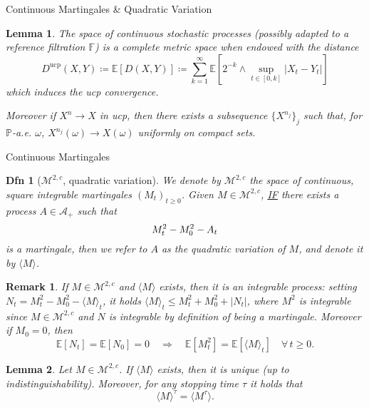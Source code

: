 \documentclass[a4paper]{article}
\theoremstyle{mytheoremstyle}
\newtheorem{definition}{Dfn}
\newtheorem{lemma}{Lemma}
\newtheorem*{remark}{Remark}
\newcommand{\1}{\mathds{1}}
\begin{document}
\begin{multicols*}{3}
\begin{roundbox}{Continuous Martingales \& Quadratic Variation}
\begin{lemma}
  \label{lem:ucp.metric}The space of continuous stochastic processes (possibly
  adapted to a reference filtration $\mathbb{F}$) is a complete metric space
  when endowed with the distance
  \[ D^{\operatorname{ucp}} (X, Y) \coloneq \mathbb{E} [D (X, Y)] \coloneq \sum_{k =
     1}^{\infty} \mathbb{E} \left[2^{- k} \wedge \sup_{t \in [0, k]} | X_t - Y_t | \right]
  \]
  which induces the ucp convergence.
  
  Moreover if $X^n \rightarrow X$ in ucp, then there exists a subsequence $\{
  X^{n_j} \}_j$ such that, for $\mathbb{P}$-a.e. $\omega$, $X^{n_j} (\omega)
  \rightarrow X (\omega)$ uniformly on compact sets.
\end{lemma}
\end{roundbox}


\begin{roundbox}{Continuous Martingales}
\begin{definition}[$\mathcal{M}^{2, c}$, quadratic variation]
  \label{defn:quadratic.variation}We denote by $\mathcal{M}^{2, c}$ the space
  of continuous, square integrable martingales $(M_t)_{t \geqslant 0}$. Given
  $M \in \mathcal{M}^{2, c}$, {\underline{IF}} there exists a process $A \in
  \mathcal{A}_+$ such that
  \vspace{-0.5em}
  \[
    M^2_t - M^2_0 - A_t
  \vspace{-0.5em}
  \]
  is a martingale, then we refer to $A$ as the {\emph{quadratic variation}} of
  $M$, and denote it by $\langle M \rangle$.
\end{definition}

\begin{remark}
  \label{rem:qv.first.properties}If $M \in \mathcal{M}^{2, c}$ and $\langle M
  \rangle$ exists, then it is an integrable process: setting $N_t = M^2_t -
  M^2_0 - \langle M \rangle_t$, it holds $\langle M \rangle_t \leqslant M_t^2
  + M_0^2 + | N_t |$, where $M^2$ is integrable since $M \in \mathcal{M}^{2,
  c}$ and $N$ is integrable by definition of being a martingale. Moreover if
  $M_0 = 0$, then
  \vspace{-0.5em}
  \[
    \mathbb{E} [N_t] =\mathbb{E} [N_0] = 0 \quad \Rightarrow \quad \mathbb{E}
     [M_t^2] =\mathbb{E} [\langle M \rangle_t] \quad \forall \, t \geqslant 0.
  \]
\end{remark}

\begin{lemma}
  \label{lem:qv.basic}Let $M \in \mathcal{M}^{2, c}$. If $\langle M \rangle$
  exists, then it is unique (up to indistinguishability). Moreover, for any
  stopping time $\tau$ it holds that
  \vspace{-0.5em}
  \[
    \langle M \rangle^{\tau} = \langle M^{\tau} \rangle .
  \]
\end{lemma}


\end{roundbox}
\end{multicols*}
\end{document}
